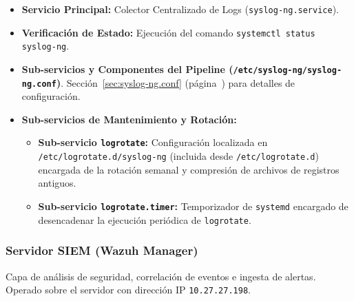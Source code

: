 \begin{itemize}
    \item \textbf{Servicio Principal:} Colector Centralizado de Logs (\texttt{syslog-ng.service}).
    \item \textbf{Verificación de Estado:} Ejecución del comando \texttt{systemctl status syslog-ng}.
    \item \textbf{Sub-servicios y Componentes del Pipeline (\texttt{/etc/syslog-ng/syslog-ng.conf})}. Sección~\ref{sec:syslog-ng.conf} (página~\pageref{sec:syslog-ng.conf}) para detalles de configuración.
    \item \textbf{Sub-servicios de Mantenimiento y Rotación:}
    \begin{itemize}
        \item \textbf{Sub-servicio \texttt{logrotate}:} Configuración localizada en \texttt{/etc/logrotate.d/syslog-ng} (incluida desde \texttt{/etc/logrotate.d}) encargada de la rotación semanal y compresión de archivos de registros antiguos.
        \item \textbf{Sub-servicio \texttt{logrotate.timer}:} Temporizador de \texttt{systemd} encargado de desencadenar la ejecución periódica de \texttt{logrotate}.
    \end{itemize}
\end{itemize}

\subsubsection{Servidor SIEM (Wazuh Manager)}
Capa de análisis de seguridad, correlación de eventos e ingesta de alertas. Operado sobre el servidor con dirección IP \texttt{10.27.27.198}.

